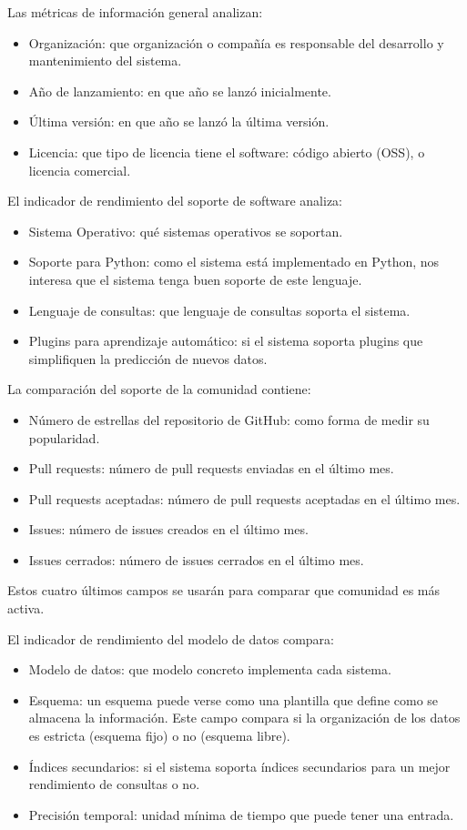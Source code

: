 Las métricas de información general analizan:
\begin{itemize}
    \item Organización: que organización o compañía es responsable del desarrollo y mantenimiento del sistema.
    \item Año de lanzamiento: en que año se lanzó inicialmente.
    \item Última versión: en que año se lanzó la última versión.
    \item Licencia: que tipo de licencia tiene el software: código abierto (OSS), o licencia comercial.
\end{itemize}
El indicador de rendimiento del soporte de software analiza:
\begin{itemize}
    \item Sistema Operativo: qué sistemas operativos se soportan.
    \item Soporte para Python: como el sistema está implementado en Python, nos interesa que el sistema tenga
        buen soporte de este lenguaje.
    \item Lenguaje de consultas: que lenguaje de consultas soporta el sistema.
    \item Plugins para aprendizaje automático: si el sistema soporta plugins que simplifiquen la predicción de nuevos
        datos.
\end{itemize}
La comparación del soporte de la comunidad contiene:
\begin{itemize}
    \item Número de estrellas del repositorio de GitHub: como forma de medir su popularidad.
    \item Pull requests: número de pull requests enviadas en el último mes.
    \item Pull requests aceptadas: número de pull requests aceptadas en el último mes.
    \item Issues: número de issues creados en el último mes.
    \item Issues cerrados: número de issues cerrados en el último mes.
\end{itemize}
Estos cuatro últimos campos se usarán para comparar que comunidad es más activa.


El indicador de rendimiento del modelo de datos compara:
\begin{itemize}
    \item Modelo de datos: que modelo concreto implementa cada sistema.
    \item Esquema: un esquema puede verse como una plantilla que define como se almacena la información. Este campo
        compara si la organización de los datos es estricta (esquema fijo) o no (esquema libre).
    \item Índices secundarios: si el sistema soporta índices secundarios para un mejor rendimiento de consultas o no.
    \item Precisión temporal: unidad mínima de tiempo que puede tener una entrada.
\end{itemize}

